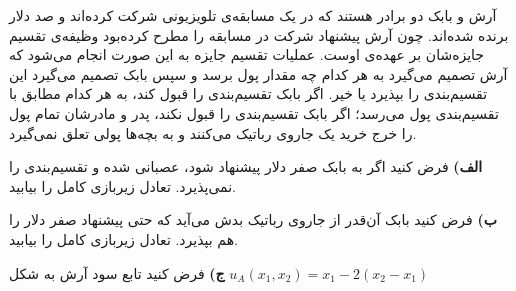 آرش و بابک دو برادر هستند که در یک مسابقه‌ی تلویزیونی شرکت کرده‌اند و صد دلار برنده شده‌اند. چون آرش پیشنهاد شرکت در مسابقه را مطرح کرده‌بود وظیفه‌ی تقسیم جایزه‌شان بر عهده‌ی اوست. عملیات تقسیم جایزه به این صورت انجام می‌شود که آرش تصمیم می‌گیرد به هر کدام چه مقدار پول برسد و سپس بابک تصمیم می‌گیرد این تقسیم‌بندی را بپذیرد یا خیر. اگر بابک تقسیم‌بندی را قبول کند، به هر کدام مطابق با تقسیم‌بندی پول می‌رسد؛ اگر بابک تقسیم‌بندی را قبول نکند، پدر و مادرشان تمام پول را خرج خرید یک جاروی رباتیک می‌کنند و به بچه‌ها پولی تعلق نمی‌گیرد.
\vspace{10pt}

\textbf{الف)}
فرض کنید اگر به بابک صفر دلار پیشنهاد شود، عصبانی شده و تقسیم‌بندی را نمی‌پذیرد. تعادل زیربازی کامل را بیابید.
\vspace{5pt}

\textbf{ب)}
فرض کنید بابک آن‌قدر از جاروی رباتیک بدش می‌آید که حتی پیشنهاد صفر دلار را هم بپذیرد. تعادل زیربازی کامل را بیابید.
\vspace{5pt}

\textbf{ج)}
فرض کنید تابع سود آرش به شکل
$u_A(x_1, x_2) = x_1 - 2(x_2 - x_1)$